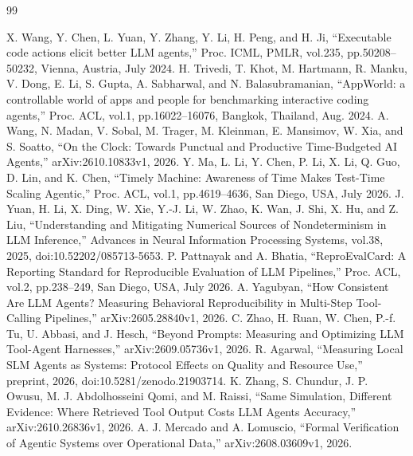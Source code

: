 \documentclass[letter]{ieicej}
\begin{document}
\begin{thebibliography}{99}
\raggedright
{} X. Wang, Y. Chen, L. Yuan, Y. Zhang, Y. Li, H. Peng, and H. Ji, ``Executable code actions elicit better LLM agents,'' Proc. ICML, PMLR, vol.235, pp.50208--50232, Vienna, Austria, July 2024.
 H. Trivedi, T. Khot, M. Hartmann, R. Manku, V. Dong, E. Li, S. Gupta, A. Sabharwal, and N. Balasubramanian, ``AppWorld: a controllable world of apps and people for benchmarking interactive coding agents,'' Proc. ACL, vol.1, pp.16022--16076, Bangkok, Thailand, Aug. 2024.
 A. Wang, N. Madan, V. Sobal, M. Trager, M. Kleinman, E. Mansimov, W. Xia, and S. Soatto, ``On the Clock: Towards Punctual and Productive Time-Budgeted AI Agents,'' arXiv:2610.10833v1, 2026.
 Y. Ma, L. Li, Y. Chen, P. Li, X. Li, Q. Guo, D. Lin, and K. Chen, ``Timely Machine: Awareness of Time Makes Test-Time Scaling Agentic,'' Proc. ACL, vol.1, pp.4619--4636, San Diego, USA, July 2026.
 J. Yuan, H. Li, X. Ding, W. Xie, Y.-J. Li, W. Zhao, K. Wan, J. Shi, X. Hu, and Z. Liu, ``Understanding and Mitigating Numerical Sources of Nondeterminism in LLM Inference,'' Advances in Neural Information Processing Systems, vol.38, 2025, doi:10.52202/085713-5653.
 P. Pattnayak and A. Bhatia, ``ReproEvalCard: A Reporting Standard for Reproducible Evaluation of LLM Pipelines,'' Proc. ACL, vol.2, pp.238--249, San Diego, USA, July 2026.
 A. Yagubyan, ``How Consistent Are LLM Agents? Measuring Behavioral Reproducibility in Multi-Step Tool-Calling Pipelines,'' arXiv:2605.28840v1, 2026.
 C. Zhao, H. Ruan, W. Chen, P.-f. Tu, U. Abbasi, and J. Hesch, ``Beyond Prompts: Measuring and Optimizing LLM Tool-Agent Harnesses,'' arXiv:2609.05736v1, 2026.
 R. Agarwal, ``Measuring Local SLM Agents as Systems: Protocol Effects on Quality and Resource Use,'' preprint, 2026, doi:10.5281/zenodo.21903714.
 K. Zhang, S. Chundur, J. P. Owusu, M. J. Abdolhosseini Qomi, and M. Raissi, ``Same Simulation, Different Evidence: Where Retrieved Tool Output Costs LLM Agents Accuracy,'' arXiv:2610.26836v1, 2026.
 A. J. Mercado and A. Lomuscio, ``Formal Verification of Agentic Systems over Operational Data,'' arXiv:2608.03609v1, 2026.
\end{thebibliography}

\label{PreviewLastBodyPage}
\end{document}

